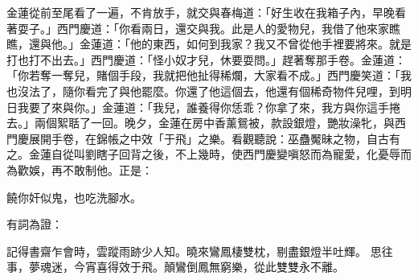 金蓮從前至尾看了一遍，不肯放手，就交與春梅道：「好生收在我箱子內，早晚看著耍子。」西門慶道：「你看兩日，還交與我。此是人的愛物兒，我借了他來家瞧瞧，還與他。」金蓮道：「他的東西，如何到我家？我又不曾從他手裡要將來。就是打也打不出去。」西門慶道：「怪小奴才兒，休要耍問。」趕著奪那手卷。金蓮道：「你若奪一奪兒，賭個手段，我就把他扯得稀爛，大家看不成。」西門慶笑道：「我也沒法了，隨你看完了與他罷麼。你還了他這個去，他還有個稀奇物件兒哩，到明日我要了來與你。」金蓮道：「我兒，誰養得你恁乖？你拿了來，我方與你這手捲去。」兩個絮聒了一回。晚夕，金蓮在房中香薰鴛被，款設銀燈，艷妝澡牝，與西門慶展開手卷，在錦帳之中效「于飛」之樂。看觀聽說：巫蠱魘昧之物，自古有之。金蓮自從叫劉瞎子回背之後，不上幾時，使西門慶變嗔怒而為寵愛，化憂辱而為歡娛，再不敢制他。正是：

饒你奸似鬼，也吃洗腳水。

有詞為證：

記得書齋乍會時，雲蹤雨跡少人知。曉來鸞鳳棲雙枕，剔盡銀燈半吐輝。
思往事，夢魂迷，今宵喜得效于飛。顛鸞倒鳳無窮樂，從此雙雙永不離。

